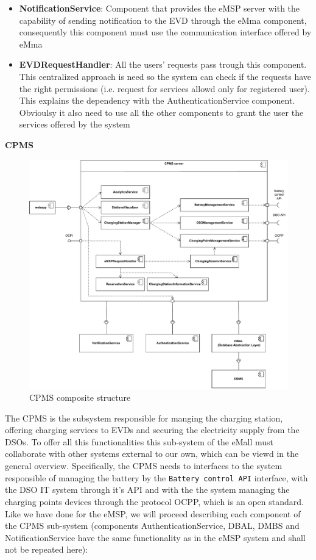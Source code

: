 \begin{itemize}
    \item \textbf{NotificationService}: Component that provides the eMSP server with the capability of sending notification to the EVD through the eMma component, consequently this component must use the communication interface offered by eMma

    \item \textbf{EVDRequestHandler}: All the users' requests pass trough this component. This centralized approach is need so the system can check if the requests have the right permissions (i.e. request for services allowd only for registered user). This explains the dependency with the AuthenticationService component. Obvioulsy it also need to use all the other components to grant the user the services offered by the system

\end{itemize}
\pagebreak

\textbf{CPMS}\\
\begin{figure}[H]
    \centering
    \includegraphics[width=1\textwidth]{Images/cp2/CPMS_server.pdf}
    \caption{CPMS composite structure}
\end{figure}

The CPMS is the subsystem responsible for manging the charging station, offering charging services to EVDs and securing the electricity supply from the DSOs. To offer all this functionalities this sub-system of the eMall must collaborate with other systems external to our own, which can be viewd in the general overview. Specifically, the CPMS needs to interfaces to the system responsible of managing the battery by the \verb|Battery control API| interface, with the DSO IT system through it's API and with the the system managing the charging points devices through the protocol OCPP, which is an open standard. Like we have done for the eMSP, we will proceed describing each component of the CPMS sub-system (components AuthenticationService, DBAL, DMBS and NotificationService have the same functionality as in the eMSP system and shall not be repeated here):

